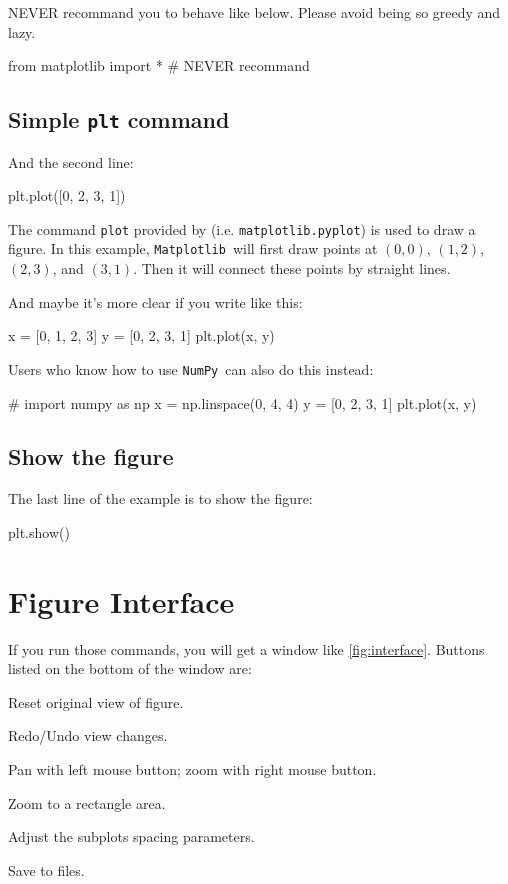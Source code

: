 \documentclass{report}
\newcommand{\pkg}[1]{\texttt{#1}}
\newcommand{\NumPy}{\pkg{NumPy}}
\newcommand{\mpl}{\texttt{Matplotlib}}
\newcommand{\nextblock}{\vspace{2ex}}
\begin{document}
NEVER recommand you to behave like below. Please avoid being so greedy and lazy.
\begin{py}
from matplotlib import * # NEVER recommand
\end{py}

\subsection{Simple \texttt{plt} command}
And the second line:
\begin{py}
plt.plot([0, 2, 3, 1])
\end{py}

The command \texttt{plot} provided by  (i.e. \texttt{matplotlib.pyplot}) is used to draw a figure. In this example, \mpl\ will first draw points at $(0,0)$, $(1,2)$, $(2,3)$, and $(3,1)$. Then it will connect these points by straight lines.

And maybe it's more clear if you write like this:
\begin{py}
x = [0, 1, 2, 3]
y = [0, 2, 3, 1]
plt.plot(x, y)
\end{py}

\nextblock Users who know how to use \NumPy\ can also do this instead:
\begin{py}
# import numpy as np
x = np.linspace(0, 4, 4)
y = [0, 2, 3, 1]
plt.plot(x, y)
\end{py}

\subsection{Show the figure}
The last line of the example is to show the figure:
\begin{py}
plt.show()
\end{py}

\section{Figure Interface}
If you run those commands, you will get a window like \autoref{fig:interface}. Buttons listed on the bottom of the window are:

\begin{description}[labelindent=.5\parindent]
\item[House:] Reset original view of figure.
\item[Arrows:] Redo/Undo view changes.
\item[Moving:] Pan with left mouse button; zoom with right mouse button.
\item[Zoom:] Zoom to a rectangle area.
\item[Subplots:] Adjust the subplots spacing parameters.
\item[Save:] Save to files. 
\end{description}
\end{document}
